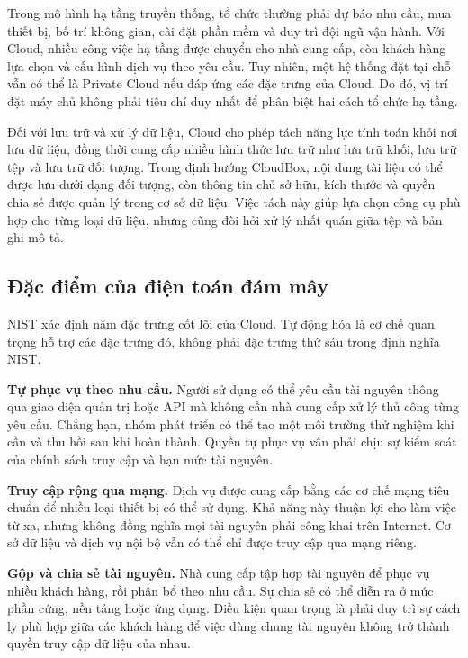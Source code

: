 Trong mô hình hạ tầng truyền thống, tổ chức thường phải dự báo nhu cầu, mua thiết bị, bố trí không gian, cài đặt phần mềm và duy trì đội ngũ vận hành. Với Cloud, nhiều công việc hạ tầng được chuyển cho nhà cung cấp, còn khách hàng lựa chọn và cấu hình dịch vụ theo yêu cầu. Tuy nhiên, một hệ thống đặt tại chỗ vẫn có thể là Private Cloud nếu đáp ứng các đặc trưng của Cloud. Do đó, vị trí đặt máy chủ không phải tiêu chí duy nhất để phân biệt hai cách tổ chức hạ tầng.

Đối với lưu trữ và xử lý dữ liệu, Cloud cho phép tách năng lực tính toán khỏi nơi lưu dữ liệu, đồng thời cung cấp nhiều hình thức lưu trữ như lưu trữ khối, lưu trữ tệp và lưu trữ đối tượng. Trong định hướng CloudBox, nội dung tài liệu có thể được lưu dưới dạng đối tượng, còn thông tin chủ sở hữu, kích thước và quyền chia sẻ được quản lý trong cơ sở dữ liệu. Việc tách này giúp lựa chọn công cụ phù hợp cho từng loại dữ liệu, nhưng cũng đòi hỏi xử lý nhất quán giữa tệp và bản ghi mô tả.

\subsection{Đặc điểm của điện toán đám mây}
NIST xác định năm đặc trưng cốt lõi của Cloud. Tự động hóa là cơ chế quan trọng hỗ trợ các đặc trưng đó, không phải đặc trưng thứ sáu trong định nghĩa NIST.\cite{nistcloud}

\textbf{Tự phục vụ theo nhu cầu.} Người sử dụng có thể yêu cầu tài nguyên thông qua giao diện quản trị hoặc API mà không cần nhà cung cấp xử lý thủ công từng yêu cầu. Chẳng hạn, nhóm phát triển có thể tạo một môi trường thử nghiệm khi cần và thu hồi sau khi hoàn thành. Quyền tự phục vụ vẫn phải chịu sự kiểm soát của chính sách truy cập và hạn mức tài nguyên.

\textbf{Truy cập rộng qua mạng.} Dịch vụ được cung cấp bằng các cơ chế mạng tiêu chuẩn để nhiều loại thiết bị có thể sử dụng. Khả năng này thuận lợi cho làm việc từ xa, nhưng không đồng nghĩa mọi tài nguyên phải công khai trên Internet. Cơ sở dữ liệu và dịch vụ nội bộ vẫn có thể chỉ được truy cập qua mạng riêng.

\textbf{Gộp và chia sẻ tài nguyên.} Nhà cung cấp tập hợp tài nguyên để phục vụ nhiều khách hàng, rồi phân bổ theo nhu cầu. Sự chia sẻ có thể diễn ra ở mức phần cứng, nền tảng hoặc ứng dụng. Điều kiện quan trọng là phải duy trì sự cách ly phù hợp giữa các khách hàng để việc dùng chung tài nguyên không trở thành quyền truy cập dữ liệu của nhau.

